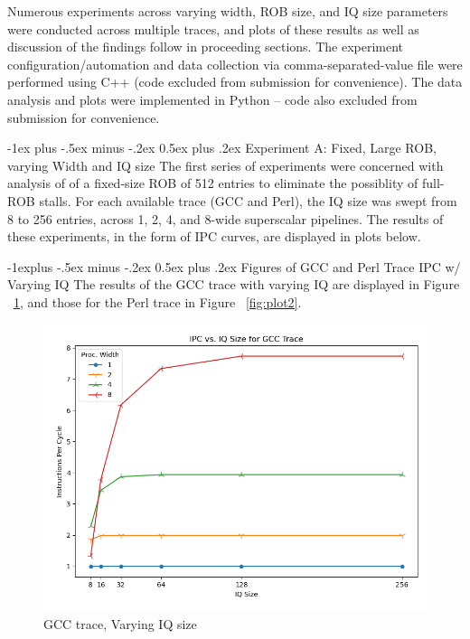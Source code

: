 \documentclass[12pt,portrait]{article}
\makeatletter
\renewcommand{\section}{\@startsection{section}{1}{0mm}%
                                {-1ex plus -.5ex minus -.2ex}%
                                {0.5ex plus .2ex}%
                                {\normalfont\large\bfseries}}
\renewcommand{\subsection}{\@startsection{subsection}{2}{0mm}%
                                {-1explus -.5ex minus -.2ex}%
                                {0.5ex plus .2ex}%
                                {\normalfont\normalsize\bfseries}}
\makeatother
\begin{document}
Numerous experiments across varying width, ROB size, and IQ size parameters were conducted across multiple traces, and plots of these results as well as discussion of the findings follow in proceeding sections. The experiment configuration/automation and data collection via comma-separated-value file were performed using C++ (code excluded from submission for convenience). The data analysis and plots were implemented in Python -- code also excluded from submission for convenience.

\section{Experiment A: Fixed, Large ROB, varying Width and IQ size}
The first series of experiments were concerned with analysis of of a fixed-size ROB of 512 entries to eliminate the possiblity of full-ROB stalls. For each available trace (GCC and Perl), the IQ size was swept from 8 to 256 entries, across 1, 2, 4, and 8-wide superscalar pipelines. The results of these experiments, in the form of IPC curves, are displayed in plots below.

\subsection{Figures of GCC and Perl Trace IPC w/ Varying IQ}
The results of the GCC trace with varying IQ are displayed in Figure ~\ref{fig:plot1}, and those for the Perl trace in Figure ~\ref{fig:plot2}.
\begin{figure}[h!]
\centering
\includegraphics[width=5in]{iqs_gcc.png}
\caption{GCC trace, Varying IQ size}
\label{fig:plot1}
\end{figure}
\end{document}
